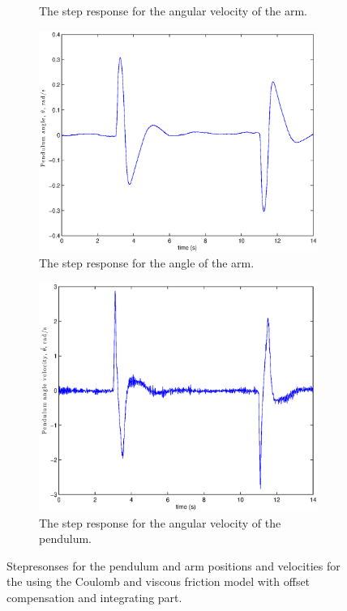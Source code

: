 \documentclass[10pt,a4paper]{article}
\begin{document}
\begin{figure}[H]
\begin{subfigure}[t]{0.49\textwidth}
			\centering
			\caption{The step response for the angular velocity of the arm.}
			\label{subfigure:srviscphidot}
		\end{subfigure}
		\begin{subfigure}[t]{0.49\textwidth}
			\includegraphics[width=1\textwidth]{plots/srthetaint.eps}
			\centering
			\caption{The step response for the angle of the arm.}			
			\label{subfigure:srvisctheta}
		\end{subfigure}
		\begin{subfigure}[t]{0.49\textwidth}
			\includegraphics[width=1\textwidth]{plots/srthetadotint.eps}
			\centering
			\caption{The step response for the angular velocity of the pendulum.}						
			\label{subfigure:srviscthetadot}
		\end{subfigure}
		\caption{Stepresonses for the pendulum and arm positions and velocities for the using the Coulomb and viscous friction model with offset compensation and integrating part.}
		\label{fig:srvisc}
\end{figure}
\end{document}
